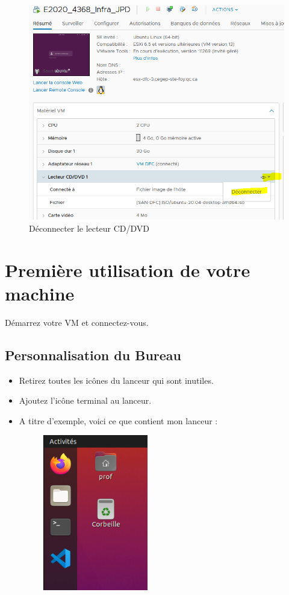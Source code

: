 \begin{itemize}
		\begin{figure}[!htb]
			\centering
			\caption{\label{Fig21}Déconnecter le lecteur CD/DVD}
			\includegraphics[scale=0.55]{images/Capture23}
		\end{figure}
		
		
	\end{itemize}
	
	\section{Première utilisation de votre machine} 
	
	
	
	Démarrez votre VM et connectez-vous.
	
	
	\subsection{Personnalisation du Bureau}
		\begin{itemize}
			\item Retirez toutes les icônes du lanceur qui sont inutiles. 
			\item Ajoutez l'icône terminal au lanceur.
			\item A titre d'exemple, voici ce que contient mon lanceur : 
			\begin{figure}[!htb]
				\centering
				\includegraphics[scale=0.8]{images/lanceur}

			\end{figure}
		\end{itemize}
